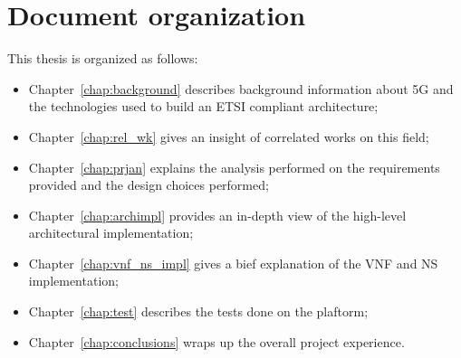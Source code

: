 \section*{Document organization}
 
This thesis is organized as follows:
\begin{itemize}
 \item Chapter~\ref{chap:background} describes background information about 5G
   and the technologies used to build an ETSI compliant architecture;
 \item Chapter~\ref{chap:rel_wk} gives an insight of correlated works on this
   field;
 \item Chapter~\ref{chap:prjan} explains the analysis performed on the
   requirements provided and the design choices performed;
 \item Chapter~\ref{chap:archimpl} provides an in-depth view of the high-level
   architectural implementation;
 \item Chapter~\ref{chap:vnf_ns_impl} gives a bief explanation of the VNF and NS
   implementation;
 \item Chapter~\ref{chap:test} describes the tests done on the plaftorm;
 \item Chapter~\ref{chap:conclusions} wraps up the overall project experience.
\end{itemize}
